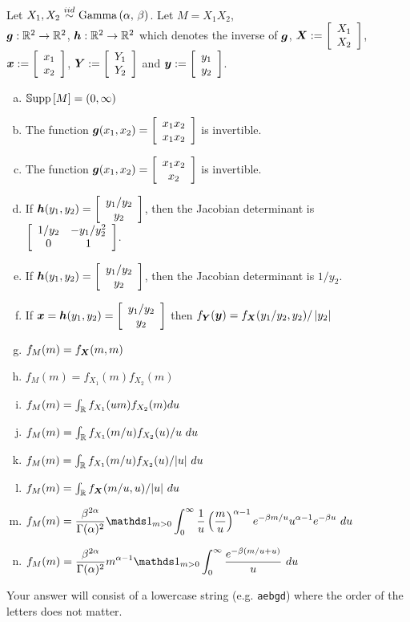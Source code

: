 \documentclass[12pt,landscape]{article}
\newcommand{\instr}{\small Your answer will consist of a lowercase string (e.g. \texttt{aebgd}) where the order of the letters does not matter. \normalsize}
\begin{document}
\problem{} Let $X_1, X_2 \iid \gammanot{\alpha}{\beta}$. Let  $M = X_1 X_2$, \\ $\boldsymbol{g} : \mathbb{R}^2 \rightarrow \mathbb{R}^2$, $\boldsymbol{h} : \mathbb{R}^2 \rightarrow \mathbb{R}^2$ which denotes the inverse of $\boldsymbol{g}$, $\boldsymbol{X} := \left[\begin{array}{c} X_1 \\ X_2 \end{array}\right]$, $\boldsymbol{x} := \left[\begin{array}{c} x_1 \\ x_2 \end{array}\right]$, $\boldsymbol{Y} := \left[\begin{array}{c} Y_1 \\ Y_2 \end{array}\right]$ and $\boldsymbol{y} := \left[\begin{array}{c} y_1 \\ y_2 \end{array}\right]$.

\vspace{-0.2cm}\benum{} 

\begin{enumerate}[(a)]
\item $\mathbb{S}\text{upp}\left[M\right] = (0, \infty)$
\item The function $\boldsymbol{g}(x_1, x_2) = \left[\begin{array}{c} x_1 x_2 \\ x_1 x_2 \end{array}\right]$ is invertible.
\item The function $\boldsymbol{g}(x_1, x_2) = \left[\begin{array}{c} x_1 x_2 \\ x_2 \end{array}\right]$ is invertible. 
\item If $\boldsymbol{h}(y_1, y_2) = \left[\begin{array}{c} y_1 / y_2 \\ y_2 \end{array}\right]$, then the Jacobian determinant is $\left[\begin{array}{cc} 1/y_2 & -y_1 / y_2^2 \\ 0 & 1 \end{array}\right]$.
\item If $\boldsymbol{h}(y_1, y_2) = \left[\begin{array}{c} y_1 / y_2 \\ y_2 \end{array}\right]$, then the Jacobian determinant is $1/y_2$.
\item If $\boldsymbol{x} = \boldsymbol{h}(y_1, y_2) = \left[\begin{array}{c} y_1 / y_2 \\ y_2 \end{array}\right]$ then $f_{\boldsymbol{Y}}(\boldsymbol{y}) = f_{\boldsymbol{X}}(y_1 / y_2, y_2) / \left|y_2\right|$

\item $f_M(m) = f_{\boldsymbol{X}}(m, m)$
\item $f_M(m) = f_{X_1}(m) f_{X_2}(m)$
\item $f_M(m) = \int_{\mathbb{R}} f_{X_1}(um) f_{X_2}(m) du$
\item $f_M(m) = \int_{\mathbb{R}} f_{X_1}(m/u) f_{X_2}(u) / u ~du$
\item $f_M(m) = \int_{\mathbb{R}} f_{X_1}(m/u) f_{X_2}(u) / |u| ~du$
\item $f_M(m) = \int_{\mathbb{R}} f_{\boldsymbol{X}}(m/u, u) / |u| ~du$

\item $f_M(m) = \displaystyle\frac{\beta^{2\alpha}}{\Gamma(\alpha)^2} \indic{m > 0} \int_0^\infty \oneover{u} \tothepow{\displaystyle \frac{m}{u}}{\alpha - 1} e^{-\beta m / u} u^{\alpha - 1} e^{-\beta u}~du$

\item $f_M(m) = \displaystyle\frac{\beta^{2\alpha}}{\Gamma(\alpha)^2} m^{\alpha - 1} \indic{m > 0} \int_0^\infty \frac{e^{-\beta (m / u + u)}}{u} ~du$

\end{enumerate}
\eenum\instr\pagebreak
\end{document}
